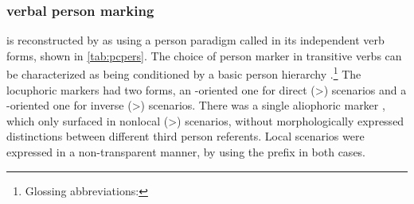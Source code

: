%





\subsubsection{\PC verbal person marking}
\label{sec:pc_person}
\PC is reconstructed by \textcite{gildea1998} as using a person paradigm called \setone in its independent verb forms, shown in \cref{tab:pcpers}.%
The choice of person marker in transitive verbs can be characterized as being conditioned by a basic person hierarchy .\footnote{Glossing abbreviations: }%
The locuphoric markers had two forms, an -oriented one for direct (>) scenarios and a -oriented one for inverse (>) scenarios.
There was a single aliophoric marker , which only surfaced in nonlocal (>) scenarios, without morphologically expressed distinctions between different third person referents.
Local scenarios were expressed in a non-transparent manner, by using the  prefix  in both cases.%

